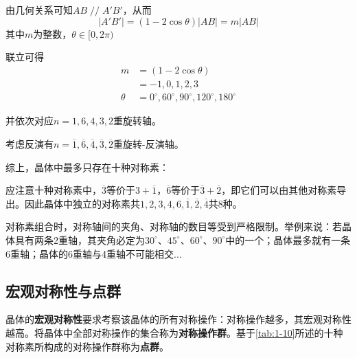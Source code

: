     由几何关系可知$AB\mathop{//}A'B'$，从而
    \[
    \left\lvert A'B' \right\rvert = (1-2\cos \theta) \left\lvert AB\right\rvert= m\left\lvert AB\right\rvert
    \]
    其中$m$为整数，$\theta \in [0, 2\pi)$

    联立可得
    \begin{align*}
        m&=(1-2\cos \theta) \\
         &=-1,0,1,2,3  \\
        \theta&=0^\circ,60^\circ,90^\circ,120^\circ,180^\circ
    \end{align*}

    并依次对应$n=1,6,4,3,2$重旋转轴。

    考虑反演有$n=\overline{1},\overline{6},\overline{4},\overline{3},\overline{2}$重旋转-反演轴。

    综上，晶体中最多只存在十种对称素：
    \begin{table}[!htbp]
        \centering
        \caption{晶体中的十种对称素}
        \label{tab:1-10}
    \end{table}

    应注意十种对称素中，$\overline{3}$等价于$3+\overline{1}$，$\overline{6}$等价于$\overline{3}+\overline{2}$，即它们可以由其他对称素导出。因此晶体中独立的对称素共$1,2,3,4,6,\overline{1},\overline{2},\overline{4}$共8种。

    对称素组合时，对称轴间的夹角、对称轴的数目等受到严格限制。举例来说：若晶体具有两条2重轴，其夹角必定为$30^{\circ}$、$45^{\circ}$、$60^{\circ}$、$90^{\circ}$中的一个；晶体最多就有一条6重轴；晶体的6重轴与4重轴不可能相交$\dots$

\subsection{宏观对称性与点群}
    晶体的\textbf{宏观对称性}要求考察该晶体的所有对称操作：对称操作越多，其宏观对称性越高。将晶体中全部对称操作的集合称为\textbf{对称操作群}。基于\autoref{tab:1-10}所述的十种对称素所构成的对称操作群称为\textbf{点群}。
    
